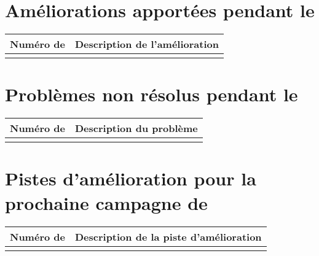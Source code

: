 
\section*{Améliorations apportées pendant le \PICCourt}

\begin{table}[H]
\centering
	\begin{tabularx}{16.8cm}{|p{4cm}|X|}
	\hline
	\rowcolor{gray!40} Numéro de \FTCourt & Description de l'amélioration \\
	\hline
	 & \\
	 \hline
	\end{tabularx}
\end{table}

\section*{Problèmes non résolus pendant le \PICCourt}

\begin{table}[H]
\centering
	\begin{tabularx}{16.8cm}{|p{4cm}|X|}
	\hline
	\rowcolor{gray!40} Numéro de \FTCourt & Description du problème \\
	\hline
	 & \\
	 \hline
	\end{tabularx}
\end{table}

\section*{Pistes d'amélioration pour la prochaine campagne de \PICCourt}

\begin{table}[H]
\centering
	\begin{tabularx}{16.8cm}{|p{4cm}|X|}
	\hline
	\rowcolor{gray!40} Numéro de \FTCourt & Description de la piste d'amélioration \\
	\hline
	 & \\
	 \hline
	\end{tabularx}
\end{table}